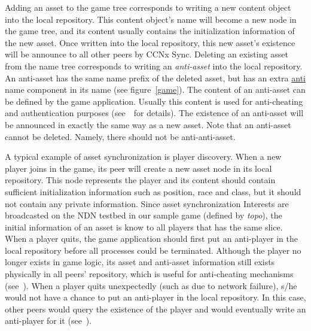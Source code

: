 \documentclass{sigchi}
\begin{document}
Adding an asset to the game tree corresponds to writing a new content object into the local repository. This content object's name will become a new node in the game tree, and its content usually contains the initialization information of the new asset. Once written into the local repository, this new asset's existence will be announce to all other peers by CCNx Sync. Deleting an existing asset from the name tree corresponds to writing an \emph{anti-asset} into the local repository. An anti-asset has the same name prefix of the deleted asset, but has an extra \url{anti} name component in its name (see figure~\ref{game}). The content of an anti-asset can be defined by the game application. Usually this content is used for anti-cheating and authentication purposes (see~~for details). The existence of an anti-asset will be announced in exactly the same way as a new asset. Note that an anti-asset cannot be deleted. Namely, there should not be anti-anti-asset. 

A typical example of asset synchronization is player discovery. When a new player joins in the game, its peer will create a new asset node in its local repository. This node represents the player and its content should contain sufficient initialization information such as position, race and class, but it should not contain any private information. Since asset synchronization Interests are broadcasted on the NDN testbed in our sample game (defined by \emph{topo}), the initial information of an asset is know to all players that has the same slice. When a player quits, the game application should first put an anti-player in the local repository before all processes could be terminated. Although the player no longer exists in game logic, its asset and anti-asset information still exists physically in all peers' repository, which is useful for anti-cheating mechanisms (see~). When a player quits unexpectedly (such as due to network failure), s/he would not have a chance to put an anti-player in the local repository. In this case, other peers would query the existence of the player and would eventually write an anti-player for it (see~).
\end{document}
